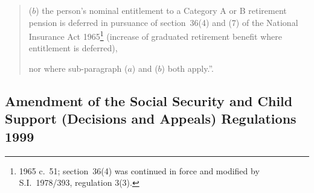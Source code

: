 \documentclass[12pt,a4paper]{article}
\begin{document}
\begin{quotation}
\begin{enumerate}
($b$) the person’s nominal entitlement to a Category A or B retirement pension is deferred in pursuance of section~36(4) and (7) of the National Insurance Act 1965\footnote{1965 c.~51; section~36(4) was continued in force and modified by S.I.~1978/393, regulation 3(3).} (increase of graduated retirement benefit where entitlement is deferred),
\end{enumerate}
nor where sub-paragraph ($a$)  and ($b$)  both apply.”.
\end{quotation}

\subsection[3. Amendment of the Social Security and Child Support (Decisions and Appeals) Regulations 1999]{Amendment of the Social Security and Child Support (Decisions and Appeals) Regulations 1999}
\end{document}
